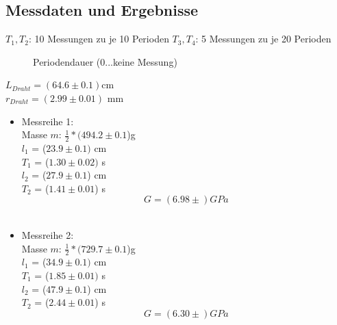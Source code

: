 \documentclass[12pt,a4paper]{article}
\begin{document}
\begin{multicols}{2}
\subsection{Messdaten und Ergebnisse}



$T_1, T_2$: 10 Messungen zu je 10 Perioden
$T_3, T_4$:   5 Messungen zu je 20 Perioden
\begin{figure}[H]
	\centering
	\caption{Periodendauer (0...keine Messung)}
	\label{fig:torsion_mw}
\end{figure}

$L_{Draht} = (64.6 \pm 0.1)$cm\\
$r_{Draht} = (2.99 \pm 0.01)$ mm\\

\begin{itemize}
	\item Messreihe 1:\\
	Masse $m$: $\frac{1}{2}*(494.2 \pm 0.1$)g\\
	$l_1$ =   ($23.9 \pm 0.1)$ cm\\
	$T_1$ = ($1.30 \pm 0.02)$ s\\
	$l_2$  =  ($27.9 \pm 0.1$) cm\\
	$T_2$ = ($1.41 \pm 0.01$) s\\
	$$ G = (6.98 \pm )GPa$$\\
	
	
	\item Messreihe 2:\\
	Masse $m$: $\frac{1}{2}*(729.7 \pm 0.1$)g\\
	$l_1$ =   ($34.9 \pm 0.1)$ cm\\
	$T_1$ = ($1.85 \pm 0.01)$ s\\
	$l_2$  =  ($47.9 \pm 0.1$) cm\\
	$T_2$ = ($2.44 \pm 0.01$) s\\
	$$ G = (6.30 \pm )GPa$$\\



\end{itemize}
\end{multicols}
\end{document}
